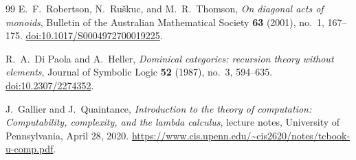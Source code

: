 \documentclass[11pt]{article}
\begin{document}
\begin{thebibliography}{99}
E.~F.~Robertson, N.~Ru\v{s}kuc, and M.~R.~Thomson,
\emph{On diagonal acts of monoids},
Bulletin of the Australian Mathematical Society \textbf{63} (2001), no.~1,
167--175.
\href{https://doi.org/10.1017/S0004972700019225}{doi:10.1017/S0004972700019225}.

R.~A.~Di Paola and A.~Heller,
\emph{Dominical categories: recursion theory without elements},
Journal of Symbolic Logic \textbf{52} (1987), no.~3, 594--635.
\href{https://doi.org/10.2307/2274352}{doi:10.2307/2274352}.

J.~Gallier and J.~Quaintance,
\emph{Introduction to the theory of computation:
Computability, complexity, and the lambda calculus},
lecture notes, University of Pennsylvania, April 28, 2020.
\url{https://www.cis.upenn.edu/~cis2620/notes/tcbook-u-comp.pdf}.

\end{thebibliography}
\end{document}
